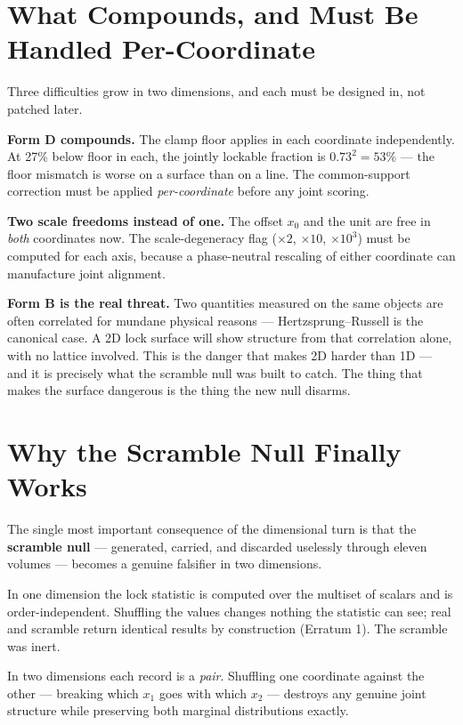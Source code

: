 \documentclass[11pt, letterpaper, openany]{book}
\begin{document}
\section{What Compounds, and Must Be Handled Per-Coordinate}

Three difficulties grow in two dimensions, and each must be designed in, not patched later.

\textbf{Form D compounds.} The clamp floor applies in each coordinate independently. At 27\%
below floor in each, the jointly lockable fraction is $0.73^2 = 53\%$ --- the floor mismatch is
worse on a surface than on a line. The common-support correction must be applied
\emph{per-coordinate} before any joint scoring.

\textbf{Two scale freedoms instead of one.} The offset $x_0$ and the unit are free in \emph{both}
coordinates now. The scale-degeneracy flag ($\times 2$, $\times 10$, $\times 10^3$) must be
computed for each axis, because a phase-neutral rescaling of either coordinate can manufacture
joint alignment.

\textbf{Form B is the real threat.} Two quantities measured on the same objects are often
correlated for mundane physical reasons --- Hertzsprung--Russell is the canonical case. A 2D lock
surface will show structure from that correlation alone, with no lattice involved. This is the
danger that makes 2D harder than 1D --- and it is precisely what the scramble null was built to
catch. The thing that makes the surface dangerous is the thing the new null disarms.

\section{Why the Scramble Null Finally Works}

The single most important consequence of the dimensional turn is that the \textbf{scramble null}
--- generated, carried, and discarded uselessly through eleven volumes --- becomes a genuine
falsifier in two dimensions.

In one dimension the lock statistic is computed over the multiset of scalars and is
order-independent. Shuffling the values changes nothing the statistic can see; real and scramble
return identical results by construction (Erratum 1). The scramble was inert.

In two dimensions each record is a \emph{pair}. Shuffling one coordinate against the other ---
breaking which $x_1$ goes with which $x_2$ --- destroys any genuine joint structure while
preserving both marginal distributions exactly.
\end{document}
